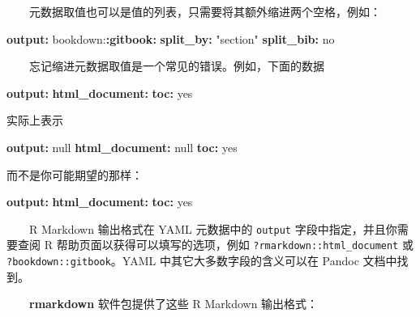 \documentclass[
  12pt,
]{krantz}
\newenvironment{Shaded}{\begin{snugshade}}{\end{snugshade}}
\newcommand{\AttributeTok}[1]{\textcolor[rgb]{0.13,0.29,0.53}{#1}}
\newcommand{\CharTok}[1]{\textcolor[rgb]{0.31,0.60,0.02}{#1}}
\newcommand{\FunctionTok}[1]{\textcolor[rgb]{0.13,0.29,0.53}{\textbf{#1}}}
\newcommand{\KeywordTok}[1]{\textcolor[rgb]{0.13,0.29,0.53}{\textbf{#1}}}
\newcommand{\StringTok}[1]{\textcolor[rgb]{0.31,0.60,0.02}{#1}}
\theoremstyle{definition}
\theoremstyle{definition}
\theoremstyle{definition}
\theoremstyle{definition}
\theoremstyle{remark}
\begin{document}
  元数据取值也可以是值的列表，只需要将其额外缩进两个空格，例如：

\begin{Shaded}
\begin{Highlighting}[]
\FunctionTok{output}\KeywordTok{:}
\AttributeTok{  bookdown:}\FunctionTok{:gitbook}\KeywordTok{:}
\AttributeTok{    }\FunctionTok{split\_by}\KeywordTok{:}\AttributeTok{ }\StringTok{"section"}
\AttributeTok{    }\FunctionTok{split\_bib}\KeywordTok{:}\AttributeTok{ }\CharTok{no}
\end{Highlighting}
\end{Shaded}

  忘记缩进元数据取值是一个常见的错误。例如，下面的数据

\begin{Shaded}
\begin{Highlighting}[]
\FunctionTok{output}\KeywordTok{:}
\FunctionTok{html\_document}\KeywordTok{:}
\FunctionTok{toc}\KeywordTok{:}\AttributeTok{ }\CharTok{yes}
\end{Highlighting}
\end{Shaded}

实际上表示

\begin{Shaded}
\begin{Highlighting}[]
\FunctionTok{output}\KeywordTok{:}\AttributeTok{ }\CharTok{null}
\FunctionTok{html\_document}\KeywordTok{:}\AttributeTok{ }\CharTok{null}
\FunctionTok{toc}\KeywordTok{:}\AttributeTok{ }\CharTok{yes}
\end{Highlighting}
\end{Shaded}

而不是你可能期望的那样：

\begin{Shaded}
\begin{Highlighting}[]
\FunctionTok{output}\KeywordTok{:}
\AttributeTok{  }\FunctionTok{html\_document}\KeywordTok{:}
\AttributeTok{    }\FunctionTok{toc}\KeywordTok{:}\AttributeTok{ }\CharTok{yes}
\end{Highlighting}
\end{Shaded}

  R Markdown 输出格式在 YAML 元数据中的 \texttt{output} 字段中指定，并且你需要查阅 R 帮助页面以获得可以填写的选项，例如 \texttt{?rmarkdown::html\_document} 或 \texttt{?bookdown::gitbook}。YAML 中其它大多数字段的含义可以在 Pandoc 文档中找到。

  \textbf{rmarkdown} 软件包提供了这些 R Markdown 输出格式：
\end{document}
